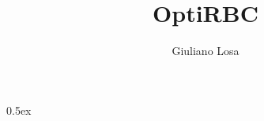 \documentclass[11pt,a4paper]{article}
\begin{document}
\title{OptiRBC}
\author{Giuliano Losa}
\maketitle

\tableofcontents

\parindent 0pt\parskip 0.5ex



%
%
\end{document}
